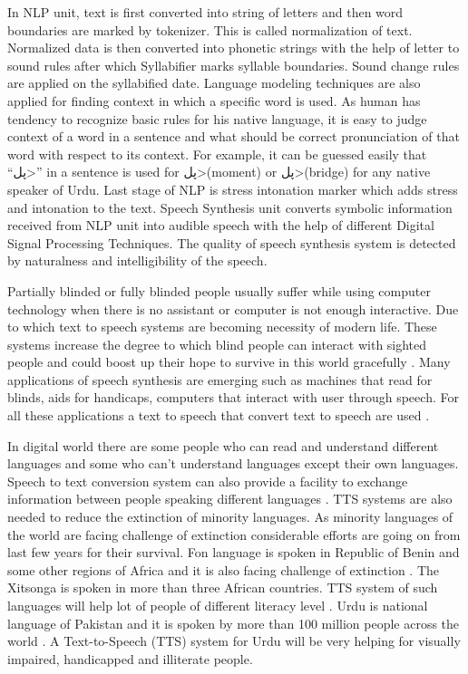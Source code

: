In NLP unit, text is first converted into string of letters and then word boundaries are marked by
tokenizer. This is called normalization of text. Normalized data is then converted into phonetic strings
with the help of letter to sound rules after which Syllabifier marks syllable boundaries. Sound change
rules are applied on the syllabified date. Language modeling techniques are also applied for finding
context in which a specific word is used. As human has tendency to recognize basic rules for his native
language, it is easy to judge context of a word in a sentence and what should be correct pronunciation of
that word with respect to its context. For example, it can be guessed easily that \enquote{\<پل>} in a sentence is used
for \<پل>(moment) or \<پل>(bridge) for any native speaker of Urdu. Last stage of NLP is stress intonation
marker which adds stress and intonation to the text. Speech Synthesis unit converts symbolic information
received from NLP unit into audible speech with the help of different Digital Signal Processing
Techniques. The quality of speech synthesis system is detected by naturalness and intelligibility of the speech.

Partially blinded or fully blinded people usually suffer while using computer technology when there is no assistant or 
computer is not enough interactive. Due to which text to speech systems are becoming necessity of modern life. 
These systems increase the degree to which blind people can interact with sighted 
people \cite{klatt1987review} and could boost up their hope to survive in this world 
gracefully \cite{eide2004corpus}. Many applications of speech synthesis are emerging such as 
machines that read for blinds, aids for handicaps, computers that interact with user through speech. 
For all these applications a text to
speech that convert text to speech are used \cite{klatt1982klattalk}.


In digital world there are some people who can read and understand different languages and some
who can’t understand languages except their own languages. Speech to text conversion system can
also provide a facility to exchange information between people speaking different languages \cite{khilari2015review}. 
TTS systems are also needed to reduce the extinction of
minority languages. As minority languages of the world are facing challenge of extinction
considerable efforts are going on from last few years for their survival. Fon language is spoken in
Republic of Benin and some other regions of Africa and it is also facing challenge of extinction \cite{dagba2014text}. 
The Xitsonga is spoken in more than three African countries.
TTS system of such languages will help lot of people of different literacy level \cite{baloyi2012text}.
Urdu is national language of Pakistan and it is spoken by more than 100 million people across the world \cite{top_30_languages}.
A Text-to-Speech (TTS) system for Urdu will be very helping for visually impaired, handicapped and illiterate people.

